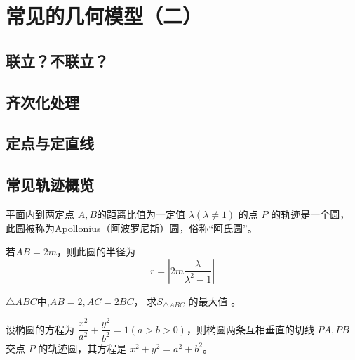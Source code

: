 \section{常见的几何模型（二）}
\subsection{联立？不联立？}
\clearpage
\subsection{齐次化处理}
\clearpage
\subsection{定点与定直线}
\clearpage
\subsection{常见轨迹概览}
\begin{theorem}[Apollonius圆]
    平面内到两定点  $A, B  $的距离比值为一定值 $ \lambda(\lambda \neq 1) $ 的点 $ P$  的轨迹是一个圆，此圆被称为Apollonius（阿波罗尼斯）圆，俗称“阿氏圆”。

    若\(AB=2m\)，则此圆的半径为
    \begin{equation}
        r=\left|2m\frac{\lambda}{\lambda^2-1}\right|
    \end{equation}
\end{theorem}
\begin{example}
    $\triangle A B C $中,$A B=2, A C=2 B C $， 求$ S_{\triangle A B C}$ 的最大值 。
\end{example}

\begin{theorem}[Monge圆]
    设椭圆的方程为 $\dfrac{x^2}{a^2} + \dfrac{y^2}{b^2} = 1 (a > b > 0)$，则椭圆两条互相垂直的切线 $PA, PB$ 交点 $P$ 的轨迹圆，其方程是 $x^2 + y^2 = a^2 + b^2$。
\end{theorem}


